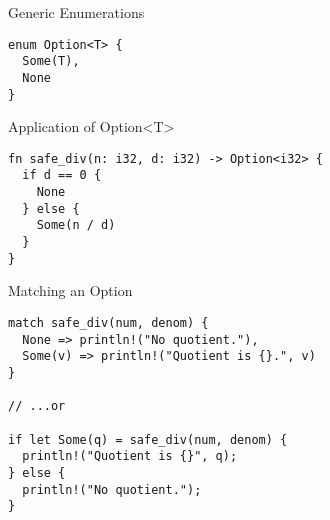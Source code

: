 
\begin{frame}[fragile]{ Generic Enumerations}
\begin{verbatim}
enum Option<T> {
  Some(T),
  None
}
\end{verbatim}
\end{frame}


\begin{frame}[fragile]{Application of Option<T>}
\begin{verbatim}
fn safe_div(n: i32, d: i32) -> Option<i32> {
  if d == 0 {
    None
  } else {
    Some(n / d)
  }
}
\end{verbatim}
\end{frame}


\begin{frame}[fragile]{Matching an Option}
\begin{verbatim}
match safe_div(num, denom) {
  None => println!("No quotient."),
  Some(v) => println!("Quotient is {}.", v)
}

// ...or

if let Some(q) = safe_div(num, denom) {
  println!("Quotient is {}", q);
} else {
  println!("No quotient.");
}
\end{verbatim}
\end{frame}



